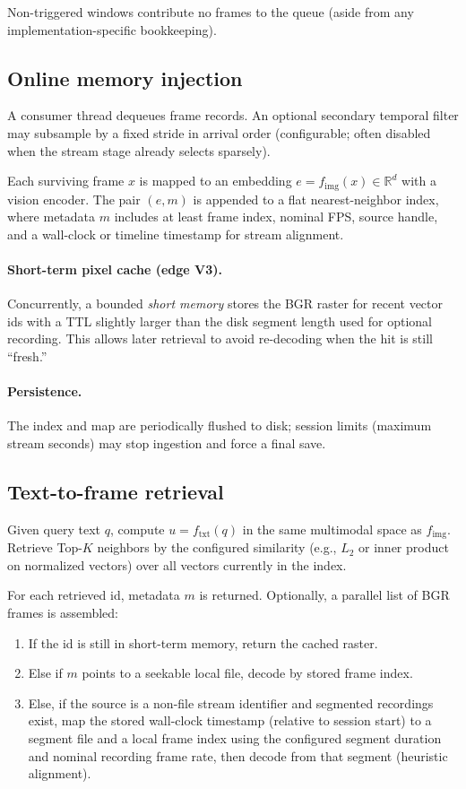 Non-triggered windows contribute no frames to the queue (aside from any
implementation-specific bookkeeping).

\subsection{Online memory injection}
\label{sec:edge-inject}

A consumer thread dequeues frame records. An optional secondary temporal filter
may subsample by a fixed stride in arrival order (configurable; often disabled
when the stream stage already selects sparsely).

Each surviving frame $x$ is mapped to an embedding
$e = f_{\mathrm{img}}(x)\in\mathbb{R}^d$ with a vision encoder. The pair
$(e, m)$ is appended to a flat nearest-neighbor index, where metadata $m$
includes at least frame index, nominal FPS, source handle, and a wall-clock or
timeline timestamp for stream alignment.

\paragraph{Short-term pixel cache (edge V3).}
Concurrently, a bounded \emph{short memory} stores the BGR raster for recent
vector ids with a TTL slightly larger than the disk segment length used for
optional recording. This allows later retrieval to avoid re-decoding when the
hit is still ``fresh.''

\paragraph{Persistence.}
The index and map are periodically flushed to disk; session limits (maximum
stream seconds) may stop ingestion and force a final save.

\subsection{Text-to-frame retrieval}
\label{sec:edge-retrieve}

Given query text $q$, compute $u = f_{\mathrm{txt}}(q)$ in the same multimodal
space as $f_{\mathrm{img}}$. Retrieve Top-$K$ neighbors by the configured
similarity (e.g., $L_2$ or inner product on normalized vectors) over all
vectors currently in the index.

For each retrieved id, metadata $m$ is returned. Optionally, a parallel list of
BGR frames is assembled:

\begin{enumerate}
  \item If the id is still in short-term memory, return the cached raster.
  \item Else if $m$ points to a seekable local file, decode by stored frame
        index.
  \item Else, if the source is a non-file stream identifier and segmented
        recordings exist, map the stored wall-clock timestamp (relative to session
        start) to a segment file and a local frame index using the configured
        segment duration and nominal recording frame rate, then decode from that
        segment (heuristic alignment).
\end{enumerate}

